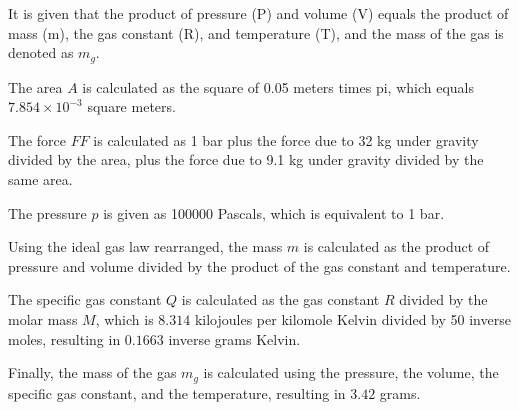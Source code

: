 It is given that the product of pressure (P) and volume (V) equals the product of mass (m), the gas constant (R), and temperature (T), and the mass of the gas is denoted as \( m_g \).

The area \( A \) is calculated as the square of 0.05 meters times pi, which equals \( 7.854 \times 10^{-3} \) square meters.

The force \( FF \) is calculated as 1 bar plus the force due to 32 kg under gravity divided by the area, plus the force due to 9.1 kg under gravity divided by the same area.

The pressure \( p \) is given as 100000 Pascals, which is equivalent to 1 bar.

Using the ideal gas law rearranged, the mass \( m \) is calculated as the product of pressure and volume divided by the product of the gas constant and temperature.

The specific gas constant \( Q \) is calculated as the gas constant \( R \) divided by the molar mass \( M \), which is \( 8.314 \) kilojoules per kilomole Kelvin divided by 50 inverse moles, resulting in \( 0.1663 \) inverse grams Kelvin.

Finally, the mass of the gas \( m_g \) is calculated using the pressure, the volume, the specific gas constant, and the temperature, resulting in \( 3.42 \) grams.